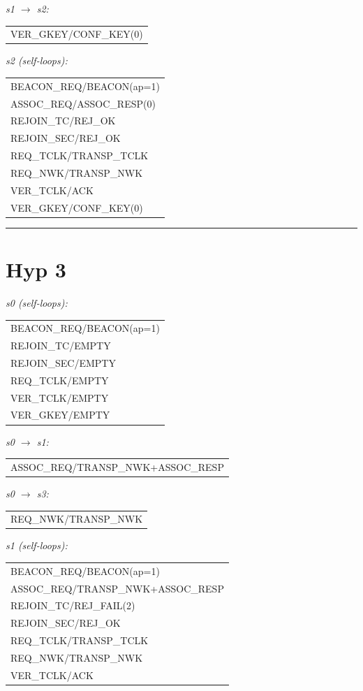 \documentclass[10pt]{article}
\makeatletter
\newcommand{\iolist}[1]{%
  \ttfamily\small
  \begin{tabular}{@{}l@{}}
  #1
  \end{tabular}%
  \rmfamily
}
\makeatother
\begin{document}
\medskip
\noindent\textit{s1 $\to$ s2:}\\[2pt]
\iolist{%
VER\_GKEY/CONF\_KEY(0)\\
}

\medskip
\noindent\textit{s2 (self-loops):}\\[2pt]
\iolist{%
BEACON\_REQ/BEACON(ap=1)\\
ASSOC\_REQ/ASSOC\_RESP(0)\\
REJOIN\_TC/REJ\_OK\\
REJOIN\_SEC/REJ\_OK\\
REQ\_TCLK/TRANSP\_TCLK\\
REQ\_NWK/TRANSP\_NWK\\
VER\_TCLK/ACK\\
VER\_GKEY/CONF\_KEY(0)\\
}

\bigskip\hrule

\section*{Hyp 3}

\noindent\textit{s0 (self-loops):}\\[2pt]
\iolist{%
BEACON\_REQ/BEACON(ap=1)\\
REJOIN\_TC/EMPTY\\
REJOIN\_SEC/EMPTY\\
REQ\_TCLK/EMPTY\\
VER\_TCLK/EMPTY\\
VER\_GKEY/EMPTY\\
}

\medskip
\noindent\textit{s0 $\to$ s1:}\\[2pt]
\iolist{%
ASSOC\_REQ/TRANSP\_NWK+ASSOC\_RESP\\
}

\medskip
\noindent\textit{s0 $\to$ s3:}\\[2pt]
\iolist{%
REQ\_NWK/TRANSP\_NWK\\
}

\medskip
\noindent\textit{s1 (self-loops):}\\[2pt]
\iolist{%
BEACON\_REQ/BEACON(ap=1)\\
ASSOC\_REQ/TRANSP\_NWK+ASSOC\_RESP\\
REJOIN\_TC/REJ\_FAIL(2)\\
REJOIN\_SEC/REJ\_OK\\
REQ\_TCLK/TRANSP\_TCLK\\
REQ\_NWK/TRANSP\_NWK\\
VER\_TCLK/ACK\\
}
\end{document}
